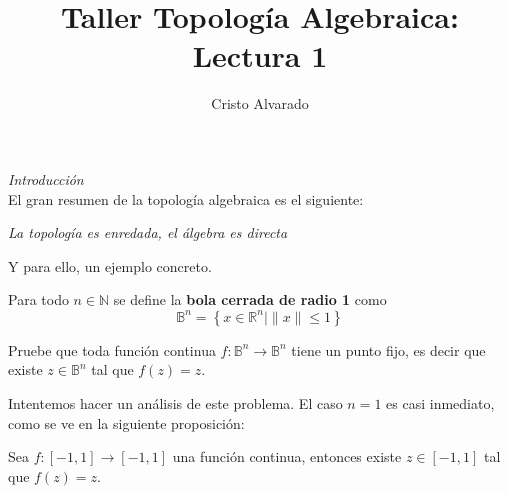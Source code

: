 \documentclass{article}
\theoremstyle{largebreak}
\newcommand{\norm}[1]{\ensuremath{\|#1\|}}
\newcommand\subtitle[1]{\textit{\large #1}\\}
\newcommand\cf[3]{\ensuremath{#1:#2\rightarrow#3}}
\begin{document}
    \title{Taller Topología Algebraica: Lectura 1}
    \author{Cristo Alvarado}
    \setcounter{section}{1}
    \maketitle

    \subtitle{Introducción}

    El gran resumen de la topología algebraica es el siguiente:

    \begin{center}
        \textit{La topología es enredada, el álgebra es directa}
    \end{center}

    Y para ello, un ejemplo concreto.

    \begin{mydef}
        Para todo $n\in\mathbb{N}$ se define la \textbf{bola cerrada de radio 1} como
        \begin{equation*}
            \mathbb{B}^n=\left\{x\in\mathbb{R}^n\Big|\norm{x}\leq1 \right\}
        \end{equation*}
    \end{mydef}

    \begin{theor}
        Pruebe que toda función continua $\cf{f}{\mathbb{B}^{n}}{\mathbb{B}^n}$ tiene un punto fijo, es decir que existe $z\in\mathbb{B}^n$ tal que $f(z)=z$.
    \end{theor}

    Intentemos hacer un análisis de este problema. El caso $n=1$ es casi inmediato, como se ve en la siguiente proposición:

    \begin{propo}
        Sea $\cf{f}{[-1,1]}{[-1,1]}$ una función continua, entonces existe $z\in[-1,1]$ tal que $f(z)=z$.
    \end{propo}
\end{document}

